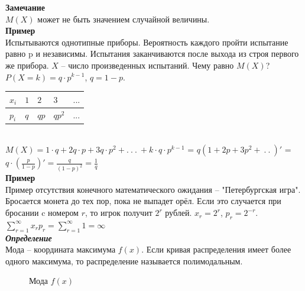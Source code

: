 \documentclass[russian, 12pt, fleqn,x11names]{article}
\begin{document}
\textbf{Замечание\ } \\
$M(X)$ может не быть значением случайной величины.\\
\textbf{Пример\ }\\
Испытываются однотипные приборы. Вероятность каждого пройти испытание равно p и независимы. Испытания заканчиваются после выхода из строя первого же прибора. $X$ -- число произведенных испытаний. Чему равно $M(X)$?\\
$P(X=k) = q\cdot p ^{k - 1}$, $q = 1 - p$.\\
\begin{tabular}[b]{ | l | l | l | l | l |   }
\hline
$x_i$&$1$&$2$&$3$&$...$\\
\hline
$p_i$&$q$&$qp$&$qp^2$&...\\
\hline
\end{tabular}\\
$M(X) = 1\cdot q + 2q\cdot p + 3 q \cdot p^2 + .\ .\ .\ +k\cdot q\cdot p^{k-1}$ = $q(1+2p+3p^2 + \ .\ .\ )'$ = $q\cdot(\frac{p}{1-p}) ' = \frac{q}{{(1-p)}^2} = \frac{1}{q}$\\
\textbf{Пример\ }\\
 Пример отсутствия конечного математического ожидания -- "Петербургская игра". Бросается монета до тех пор, пока не выпадет орёл. Если это случается при бросании c номером $r$, то игрок получит $2^r$ рублей. $x_r=2^r$, $p_r=2^{-r}$.\\ $\sum\limits_{r = 1}^{\infty}  x_rp_r = \sum\limits_{r = 1}^{\infty} 1 = \infty$\\
\textit{\textbf{Определение}}\\
Мода -- координата максимума $f(x)$. Если кривая распределения имеет более одного максимума, то распределение называется полимодальным.
\begin{figure}[!h]
\caption{Мода $f(x)$}
\end{figure}\\
\end{document}
